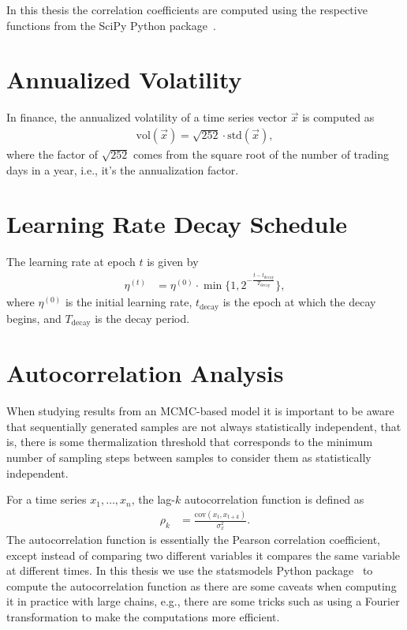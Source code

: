 In this thesis the correlation coefficients are computed using the respective functions from the SciPy Python package~\cite{python_scipy}.

\section{Annualized Volatility}\label{app:annualized_volatility}
In finance, the annualized volatility of a time series vector \( \vec{x} \) is computed as
\begin{align}
    \text{vol}(\vec{x}) = \sqrt{252} \cdot \text{std}(\vec{x}),
\end{align}
where the factor of \( \sqrt{252} \) comes from the square root of the number of trading days in a year, i.e., it's the annualization factor.

\section{Learning Rate Decay Schedule}\label{app:lr_exp_decay}
The learning rate at epoch \( t \) is given by
\begin{align}
    \eta^{(t)}
        &= \eta^{(0)} \cdot \min\bigg\{1, 2^{-\frac{t - t_\text{decay}}{T_\text{decay}}}\bigg\},
\end{align}
where \( \eta^{(0)} \) is the initial learning rate, \( t_\text{decay} \) is the epoch at which the decay begins, and \( T_\text{decay} \) is the decay period.

\section{Autocorrelation Analysis}\label{app:autocorrelation_analysis}
When studying results from an MCMC-based model it is important to be aware that sequentially generated samples are not always statistically independent, that is, there is some thermalization threshold that corresponds to the minimum number of sampling steps between samples to consider them as statistically independent.

For a time series \( x_1, \dots, x_n \), the lag-\( k \) autocorrelation function is defined as~\cite{time_series_analysis}
\begin{align}
    \rho_k
        &= \frac{\text{cov}(x_t, x_{t+k})}{\sigma_{x}^2}.
\end{align}
The autocorrelation function is essentially the Pearson correlation coefficient, except instead of comparing two different variables it compares the same variable at different times.
In this thesis we use the statsmodels Python package~\cite{python_statsmodels} to compute the autocorrelation function as there are some caveats when computing it in practice with large chains, e.g., there are some tricks such as using a Fourier transformation to make the computations more efficient.

